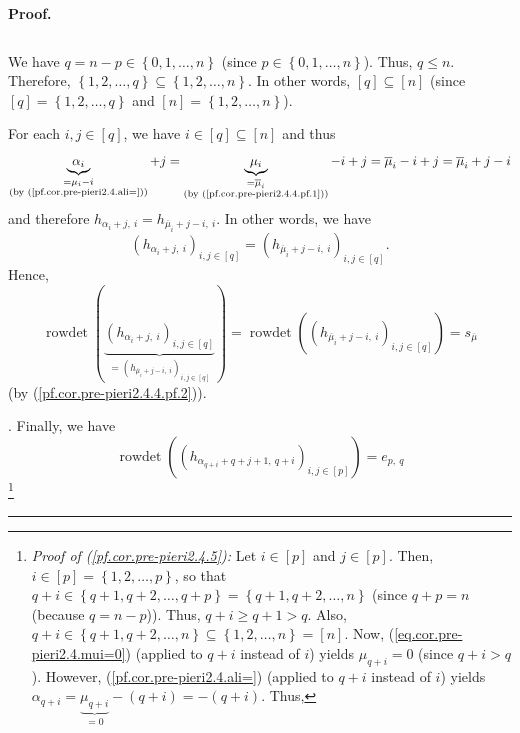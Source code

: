 \documentclass[numbers=enddot,12pt,final,onecolumn,notitlepage,english]{scrartcl}%
\theoremstyle{definition}
\newenvironment{proof}[1][Proof]{\noindent\textbf{#1.} }{\ \rule{0.5em}{0.5em}}
\newenvironment{verlong}{}{}
\begin{document}
\begin{verlong}
\begin{proof}
{\begin{equation}
\end{equation}
\par
We have $q=n-p\in\left\{  0,1,\ldots,n\right\}  $ (since $p\in\left\{
0,1,\ldots,n\right\}  $). Thus, $q\leq n$. Therefore, $\left\{  1,2,\ldots
,q\right\}  \subseteq\left\{  1,2,\ldots,n\right\}  $. In other words,
$\left[  q\right]  \subseteq\left[  n\right]  $ (since $\left[  q\right]
=\left\{  1,2,\ldots,q\right\}  $ and $\left[  n\right]  =\left\{
1,2,\ldots,n\right\}  $).
\par
For each $i,j\in\left[  q\right]  $, we have $i\in\left[  q\right]
\subseteq\left[  n\right]  $ and thus%
\[
\underbrace{\alpha_{i}}_{\substack{=\mu_{i}-i\\\text{(by
(\ref{pf.cor.pre-pieri2.4.ali=}))}}}+j=\underbrace{\mu_{i}}%
_{\substack{=\overline{\mu}_{i}\\\text{(by (\ref{pf.cor.pre-pieri2.4.4.pf.1}%
))}}}-i+j=\overline{\mu}_{i}-i+j=\overline{\mu}_{i}+j-i
\]
and therefore $h_{\alpha_{i}+j,\ i}=h_{\overline{\mu}_{i}+j-i,\ i}$. In other
words, we have
\[
\left(  h_{\alpha_{i}+j,\ i}\right)  _{i,j\in\left[  q\right]  }=\left(
h_{\overline{\mu}_{i}+j-i,\ i}\right)  _{i,j\in\left[  q\right]  }.
\]
Hence,%
\[
\operatorname*{rowdet}\left(  \underbrace{\left(  h_{\alpha_{i}+j,\ i}\right)
_{i,j\in\left[  q\right]  }}_{=\left(  h_{\overline{\mu}_{i}+j-i,\ i}\right)
_{i,j\in\left[  q\right]  }}\right)  =\operatorname*{rowdet}\left(  \left(
h_{\overline{\mu}_{i}+j-i,\ i}\right)  _{i,j\in\left[  q\right]  }\right)
=s_{\overline{\mu}}%
\]
(by (\ref{pf.cor.pre-pieri2.4.4.pf.2})).}. Finally, we have%
\begin{equation}
\operatorname*{rowdet}\left(  \left(  h_{\alpha_{q+i}+q+j+1,\ q+i}\right)
_{i,j\in\left[  p\right]  }\right)  =e_{p,\ q} \label{pf.cor.pre-pieri2.4.5}%
\end{equation}
\footnote{\textit{Proof of (\ref{pf.cor.pre-pieri2.4.5}):} Let $i\in\left[
p\right]  $ and $j\in\left[  p\right]  $. Then, $i\in\left[  p\right]
=\left\{  1,2,\ldots,p\right\}  $, so that $q+i\in\left\{  q+1,q+2,\ldots
,q+p\right\}  =\left\{  q+1,q+2,\ldots,n\right\}  $ (since $q+p=n$ (because
$q=n-p$)). Thus, $q+i\geq q+1>q$. Also, $q+i\in\left\{  q+1,q+2,\ldots
,n\right\}  \subseteq\left\{  1,2,\ldots,n\right\}  =\left[  n\right]  $. Now,
(\ref{eq.cor.pre-pieri2.4.mui=0}) (applied to $q+i$ instead of $i$) yields
$\mu_{q+i}=0$ (since $q+i>q$). However, (\ref{pf.cor.pre-pieri2.4.ali=})
(applied to $q+i$ instead of $i$) yields $\alpha_{q+i}=\underbrace{\mu_{q+i}%
}_{=0}-\left(  q+i\right)  =-\left(  q+i\right)  $. Thus,%
}
\end{proof}
\end{verlong}
\end{document}
